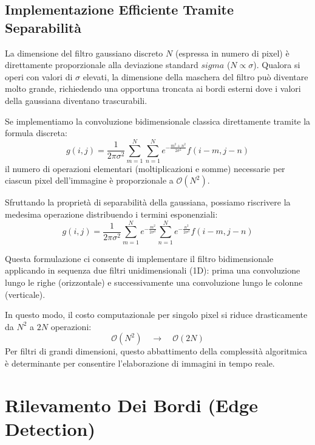 ﻿\documentclass[11pt, a4paper]{article}
\begin{document}

\subsection{Implementazione Efficiente Tramite Separabilità}

La dimensione del filtro gaussiano discreto $N$ (espressa in numero di pixel) è direttamente proporzionale alla deviazione standard $sigma$ ($N \propto \sigma$). Qualora si operi con valori di $\sigma$ elevati, la dimensione della maschera del filtro può diventare molto grande, richiedendo una opportuna troncata ai bordi esterni dove i valori della gaussiana diventano trascurabili.

Se implementiamo la convoluzione bidimensionale classica direttamente tramite la formula discreta:
\[ g(i,j) = \frac{1}{2\pi\sigma^2} \sum_{m=1}^{N} \sum_{n=1}^{N} e^{-\frac{m^2 + n^2}{2\sigma^2}} f(i-m, j-n) \]
il numero di operazioni elementari (moltiplicazioni e somme) necessarie per ciascun pixel dell'immagine è proporzionale a $\mathcal{O}(N^2)$.

Sfruttando la proprietà di separabilità della gaussiana, possiamo riscrivere la medesima operazione distribuendo i termini esponenziali:
\[ g(i,j) = \frac{1}{2\pi\sigma^2} \sum_{m=1}^{N} e^{-\frac{m^2}{2\sigma^2}} \sum_{n=1}^{N} e^{-\frac{n^2}{2\sigma^2}} f(i-m, j-n) \]

Questa formulazione ci consente di implementare il filtro bidimensionale applicando in sequenza due filtri unidimensionali (1D): prima una convoluzione lungo le righe (orizzontale) e successivamente una convoluzione lungo le colonne (verticale).

In questo modo, il costo computazionale per singolo pixel si riduce drasticamente da $N^2$ a $2N$ operazioni:
\[ \mathcal{O}(N^2) \quad \longrightarrow \quad \mathcal{O}(2N) \]
Per filtri di grandi dimensioni, questo abbattimento della complessità algoritmica è determinante per consentire l'elaborazione di immagini in tempo reale.


\newpage

\section{Rilevamento Dei Bordi (Edge Detection)}
\end{document}
